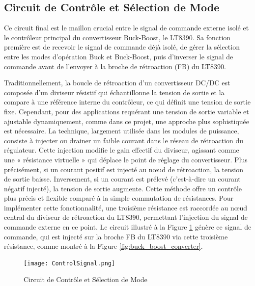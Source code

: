 \subsection{Circuit de Contrôle et Sélection de Mode}

Ce circuit final est le maillon crucial entre le signal de commande externe isolé et le contrôleur principal du convertisseur Buck-Boost, le LT8390. Sa fonction première est de recevoir le signal de commande déjà isolé, de gérer la sélection entre les modes d'opération Buck et Buck-Boost, puis d'inverser le signal de commande avant de l'envoyer à la broche de rétroaction (FB) du LT8390.

Traditionnellement, la boucle de rétroaction d'un convertisseur DC/DC est composée d'un diviseur résistif qui échantillonne la tension de sortie et la compare à une référence interne du contrôleur, ce qui définit une tension de sortie fixe. Cependant, pour des applications requérant une tension de sortie variable et ajustable dynamiquement, comme dans ce projet, une approche plus sophistiquée est nécessaire. La technique, largement utilisée dans les modules de puissance, consiste à injecter ou drainer un faible courant dans le réseau de rétroaction du régulateur. Cette injection modifie le gain effectif du diviseur, agissant comme une « résistance virtuelle » qui déplace le point de réglage du convertisseur. Plus précisément, si un courant positif est injecté au nœud de rétroaction, la tension de sortie baisse. Inversement, si un courant est prélevé (c'est-à-dire un courant négatif injecté), la tension de sortie augmente. Cette méthode offre un contrôle plus précis et flexible comparé à la simple commutation de résistances. Pour implémenter cette fonctionnalité, une troisième résistance est raccordée au nœud central du diviseur de rétroaction du LT8390, permettant l'injection du signal de commande externe en ce point. Le circuit illustré à la Figure \ref{fig:control_signal_circuit} génère ce signal de commande, qui est injecté sur la broche FB du LT8390 via cette troisième résistance, comme montré à la Figure \ref{fig:buck_boost_converter}.

\begin{figure}[H]
\centering
\texttt{[image: ControlSignal.png]}
\caption{Circuit de Contrôle et Sélection de Mode}
\label{fig:control_signal_circuit}
\end{figure}

